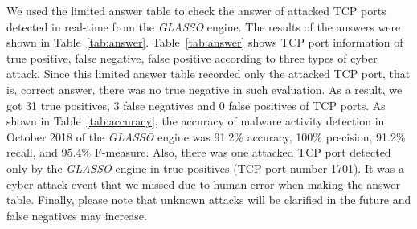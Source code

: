 \documentclass[conference]{IEEEtran}
\begin{document}
We used the limited answer table to check the answer of attacked TCP ports detected in real-time from the {\it GLASSO} engine.
The results of the answers were shown in Table~\ref{tab:answer}.
Table~\ref{tab:answer} shows TCP port information of true positive, false negative, false positive according to three types of cyber attack.
Since this limited answer table recorded only the attacked TCP port, that is, correct answer, there was no true negative in such evaluation.
As a result, we got 31 true positives, 3 false negatives and 0 false positives of TCP ports.
As shown in Table~\ref{tab:accuracy}, the accuracy of malware activity detection in October 2018 of the {\it GLASSO} engine was 91.2\% accuracy, 100\% precision, 91.2\% recall, and 95.4\% F-measure.
Also, there was one attacked TCP port detected only by the {\it GLASSO} engine in true positives (TCP port number 1701).
It was a cyber attack event that we missed due to human error when making the answer table.
Finally, please note that unknown attacks will be clarified in the future and false negatives may increase.
\end{document}

